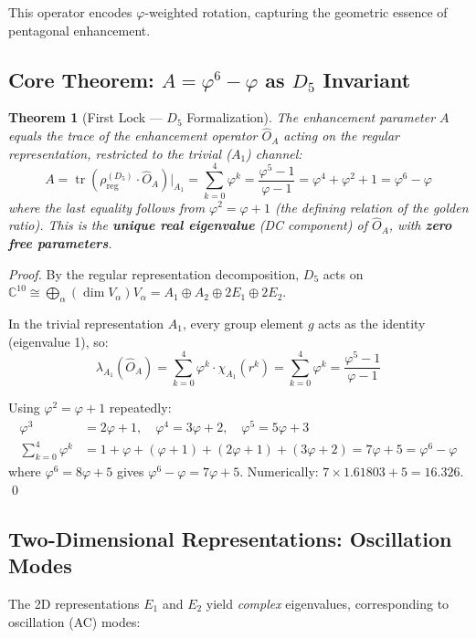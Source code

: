 \documentclass[12pt,a4paper,twocolumn]{article}
\renewcommand{\phi}{\varphi}
\newtheorem{theorem}{Theorem}[section]
\begin{document}
This operator encodes $\phi$-weighted rotation, capturing the geometric essence of pentagonal enhancement.

\subsection{Core Theorem: $A = \phi^6 - \phi$ as $D_5$ Invariant}

\begin{theorem}[First Lock --- $D_5$ Formalization]
\label{thm:d5_A}
The enhancement parameter $A$ equals the trace of the enhancement operator $\hat{O}_A$ acting on the regular representation, restricted to the trivial ($A_1$) channel:
\[
A = \operatorname{tr}\!\left(\rho_{\mathrm{reg}}^{(D_5)} \cdot \hat{O}_A\right) \Big|_{A_1} = \sum_{k=0}^{4} \phi^k = \frac{\phi^5 - 1}{\phi - 1} = \phi^4 + \phi^2 + 1 = \phi^6 - \phi
\]
where the last equality follows from $\phi^2 = \phi + 1$ (the defining relation of the golden ratio). This is the \textbf{unique real eigenvalue} (DC component) of $\hat{O}_A$, with \textbf{zero free parameters}.
\end{theorem}

\begin{proof}
By the regular representation decomposition, $D_5$ acts on $\mathbb{C}^{10} \cong \bigoplus_\alpha (\dim V_\alpha) V_\alpha = A_1 \oplus A_2 \oplus 2E_1 \oplus 2E_2$.

In the trivial representation $A_1$, every group element $g$ acts as the identity (eigenvalue 1), so:
\[
\lambda_{A_1}(\hat{O}_A) = \sum_{k=0}^{4} \phi^k \cdot \chi_{A_1}(r^k) = \sum_{k=0}^{4} \phi^k = \frac{\phi^5 - 1}{\phi - 1}
\]

Using $\phi^2 = \phi + 1$ repeatedly:
\begin{align*}
\phi^3 &= 2\phi + 1, \quad \phi^4 = 3\phi + 2, \quad \phi^5 = 5\phi + 3 \\
\sum_{k=0}^{4} \phi^k &= 1 + \phi + (\phi+1) + (2\phi+1) + (3\phi+2) = 7\phi + 5 = \phi^6 - \phi
\end{align*}
where $\phi^6 = 8\phi + 5$ gives $\phi^6 - \phi = 7\phi + 5$. Numerically: $7 \times 1.61803 + 5 = 16.326$. \qed
\end{proof}

\subsection{Two-Dimensional Representations: Oscillation Modes}
The 2D representations $E_1$ and $E_2$ yield \emph{complex} eigenvalues, corresponding to oscillation (AC) modes:
\end{document}
